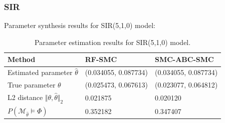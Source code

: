 \documentclass{beamer}
\begin{document}
\begin{frame}
    \frametitle{SIR}
    \noindent Parameter synthesis results for SIR(5,1,0) model:
    \begin{table}[H]
        \begin{tabular}{|l|l|l|}
            \hline
            Method                                           & RF-SMC               & SMC-ABC-SMC          \\ \hline
            Estimated parameter $\hat{\theta}$               & (0.034055, 0.087734) & (0.034055, 0.087734) \\ \hline
            True parameter $\theta$                          & (0.025473, 0.067613) & (0.023077, 0.064812) \\ \hline
            L2 distance $\Vert \theta, \hat{\theta} \Vert_2$ & 0.021875             & 0.020120             \\ \hline
            $P(\mathcal{M}_{\hat{\theta}}\models\Phi)$       & 0.352182             & 0.347407             \\ \hline
        \end{tabular}
        \caption{Parameter estimation results for SIR(5,1,0) model.}
    \end{table}
\end{frame}
\end{document}
